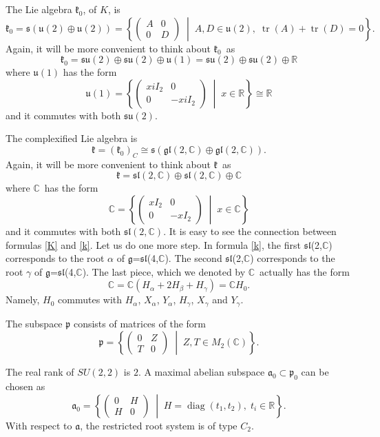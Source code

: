 \documentclass[twoside,a4paper,12pt]{article}
\newcommand{\g}{\ensuremath{\mathfrak g}}
\newcommand{\gl}{\ensuremath{\mathfrak g}{\mathfrak l}}
\newcommand{\kk}{\ensuremath{\mathfrak k}}
\newcommand{\kko}{\ensuremath{{\mathfrak k}_0}}
\newcommand{\s}{\ensuremath{\mathfrak s}}
\newcommand{\su}{\ensuremath{{\mathfrak s}{\mathfrak u}}}
\newcommand{\esl}{\ensuremath{{\mathfrak s}{\mathfrak l}}}
\newcommand{\uu}{\ensuremath{\mathfrak u}}
\newcommand{\C}{\ensuremath{\mathbb C}}
\newcommand{\R}{\ensuremath{\mathbb R}}
\theoremstyle{definition}
\begin{document}
The Lie algebra \kko, of $K$, is
\[ \kko=\s(\uu(2)\oplus\uu(2))=\left\{
	\begin{pmatrix}
		A & 0 \\
		0 & D
	\end{pmatrix}\;\middle|\;A, D \in \mathfrak{u}(2),\; \operatorname{tr}(A) +
	\operatorname{tr}(D) = 0\right\}. \]
Again, it will be more convenient to think about \kko\ as
\[ \kko=\su(2)\oplus\su(2)\oplus\uu(1)=\su(2)\oplus\su(2)\oplus\R \]
where $\uu(1)$ has the form
\[ \uu(1)=\left\{
	\begin{pmatrix}
		xiI_2 & 0 \\
		0 & -xiI_2
	\end{pmatrix}\;\middle|\;x\in\R\right\}\cong\R \]
and it commutes with both $\su(2)$.

The complexified Lie algebra is
\[ \kk=(\kko)_C \cong \mathfrak{s}(\gl(2,\mathbb{C})
	\oplus \mathfrak{gl}(2,\mathbb{C})). \]
Again, it will be more convenient to think about \kk\ as
\begin{equation}\label{k}
	\kk=\esl(2,\C)\oplus\esl(2,\C)\oplus\C
\end{equation}
where \C\ has the form
\[ \C=\left\{
\begin{pmatrix}
	xI_2 & 0 \\
	0 & -xI_2
\end{pmatrix}\;\middle|\;x\in\C\right\} \]
and it commutes with both $\esl(2,\C)$. It is easy to see the connection
between formulas \eqref{K} and \eqref{k}. Let us do one more step. In formula
\eqref{k}, the first \esl(2,\C) corresponds to the root $\alpha$ of
\g=\esl(4,\C). The second \esl(2,\C) corresponds to the root $\gamma$ of
\g=\esl(4,\C). The last piece, which we denoted by \C\ actually has the form
\begin{equation*}
	\C=\C(H_\alpha+2H_\beta+H_\gamma)=\C H_0.
\end{equation*}
Namely, $H_0$ commutes with $H_\alpha$, $X_\alpha$, $Y_\alpha$, $H_\gamma$,
$X_\gamma$ and $Y_\gamma$.

The subspace $\mathfrak{p}$ consists of matrices of the form
\[ \mathfrak{p}=\left\{
	\begin{pmatrix}
		0 & Z \\
		T & 0
	\end{pmatrix}\;\middle|\;Z,T \in M_2(\mathbb{C})\right\}. \]

The real rank of $SU(2,2)$ is $2$. A maximal abelian subspace 
$\mathfrak{a}_0\subset \mathfrak{p}_0$ can be chosen as
\[ \mathfrak{a}_0=\left\{
	\begin{pmatrix}
		0 & H \\
		H & 0
	\end{pmatrix}\;\middle|\;H = \operatorname{diag}(t_1, t_2),\; t_i 
	\in \mathbb{R}\right\}. \]
With respect to $\mathfrak{a}$, the restricted root system is of type $C_2$.
\end{document}

